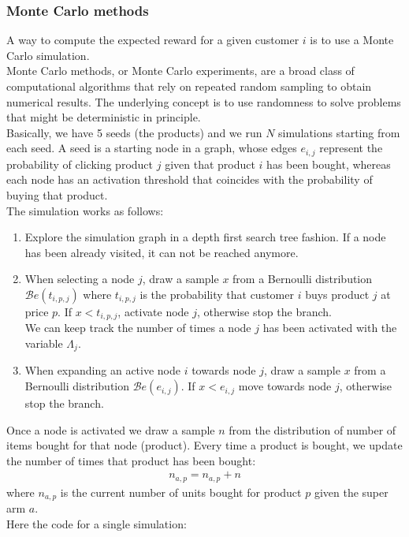 \subsubsection{Monte Carlo methods}
A way to compute the expected reward for a given customer $i$ is to use a Monte Carlo simulation.\\ Monte Carlo methods, or Monte Carlo experiments, are a broad class of computational algorithms that rely on repeated random sampling to obtain numerical results. The underlying concept is to use randomness to solve problems that might be deterministic in principle.\\ Basically, we have 5 seeds (the products) and we run $N$ simulations starting from each seed.
A seed is a starting node in a graph, whose edges $e_{i, j}$ represent the probability of clicking product $j$ given that product $i$ has been bought, whereas each node has an activation threshold that coincides with the probability of buying that product.\\
The simulation works as follows:
\begin{enumerate}
    \item Explore the simulation graph in a depth first search tree fashion. If a node has been already visited, it can not be reached anymore.
    \item When selecting a node $j$, draw a sample $x$ from a Bernoulli distribution  $\mathcal{B}e(t_{i, p, j})$ where $t_{i, p, j}$ is the probability that customer $i$ buys product $j$ at price $p$. If $x < t_{i, p, j}$, activate node $j$, otherwise stop the branch.\\ We can keep track the number of times a node $j$ has been activated with the variable $\Lambda_j$.
    \item When expanding an active node $i$ towards node $j$, draw a sample $x$ from a Bernoulli distribution $\mathcal{B}e(e_{i, j})$. If $x < e_{i, j}$ move towards node $j$, otherwise stop the branch.
\end{enumerate}
Once a node is activated we draw a sample $n$ from the distribution of number of items bought for that node (product). Every time a product is bought, we update the number of times that product has been bought:
\begin{align*}
    n_{a, p} = n_{a, p} + n
\end{align*}
where $n_{a, p}$ is the current number of units bought for product $p$ given the super arm $a$.\\
Here the code for a single simulation:\\
